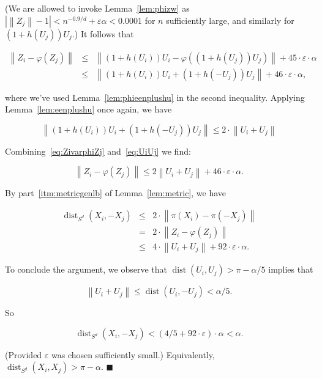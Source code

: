 \documentclass[11pt]{article}%
\newenvironment{proofof}[1]{\vspace{1ex}\noindent{\bf Proof of #1.}}{\hspace*{\fill}$\blacksquare$\vspace{1ex}}
\newcommand{\eR}[0]{\ensuremath{ \mathbb R}}
\newcommand{\norm}[1]{\ensuremath{\left\|#1\right\|}}
\newcommand{\eps}{\varepsilon}
\DeclareMathOperator{\dist}{dist}
\begin{document}
\begin{proofof}{Corollary~\ref{cor:metriccc}}
\noindent
(We are allowed to invoke Lemma~\ref{lem:phizw} as $|\norm{Z_j}-1| < n^{-0.9/d} + \eps\alpha < 0.0001$ 
for $n$ sufficiently large, and similarly for $(1+h(U_j))U_j$.)
It follows that 

\begin{equation}\label{eq:ZivarphiZj} \begin{array}{rcl} 
\norm{Z_i - \varphi(Z_j)} 
& \leq &  
\norm{(1+h(U_i))U_i - \varphi((1+h(U_j))U_j)} + 45 \cdot \eps \cdot \alpha \\
& \leq & 
\norm{(1+h(U_i))U_i + (1+h(-U_j))U_j} + 46 \cdot \eps \cdot \alpha, 
\end{array} \end{equation}

\noindent 
where we've used Lemma~\ref{lem:phieenplushu} in the second inequality.
Applying Lemma~\ref{lem:eenplushu} once again, we have 

\begin{equation}\label{eq:UiUj} 
\norm{(1+h(U_i))U_i + (1+h(-U_j))U_j} \leq 2 \cdot \norm{U_i+U_j} 
\end{equation}
   
\noindent
Combining~\eqref{eq:ZivarphiZj} and~\eqref{eq:UiUj} we find:

$$ \norm{Z_i - \varphi(Z_j)} \leq 2 \norm{U_i+U_j} + 46 \cdot \eps \cdot \alpha. $$

\noindent
By part~\ref{itm:metricgenlb} of Lemma~\ref{lem:metric}, we have 

$$ \begin{array}{rcl} 
\dist_{S^d}(X_i,-X_j) 
& \leq & 
2\cdot \norm{\pi(X_i)-\pi(-X_j)} \\
& = & 
2 \cdot \norm{Z_i - \varphi(Z_j)} \\
& \leq & 
4 \cdot \norm{U_i+U_j} + 92 \cdot \eps \cdot \alpha.
\end{array} $$

\noindent 
To conclude the argument, we observe that $\dist(U_i,U_j) > \pi-\alpha/5$ implies that  

$$ \norm{U_i+U_j} \leq \dist(U_i,-U_j) < \alpha/5. $$

\noindent 
So

$$ \dist_{S^d}(X_i,-X_j) < (4/5 + 92\cdot\eps)\cdot \alpha < \alpha. $$

\noindent
(Provided $\eps$ was chosen sufficiently small.)
Equivalently, $\dist_{S^d}(X_i,X_j) > \pi-\alpha$.
\end{proofof}
% 
% 
\end{document}
